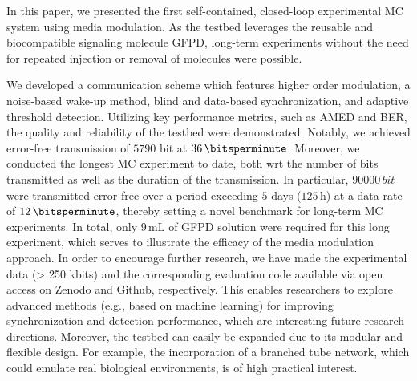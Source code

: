In this paper, we presented the first self-contained, closed-loop experimental \ac{MC} system using media modulation. As the testbed leverages the reusable and biocompatible signaling molecule \ac{GFPD}, long-term experiments without the need for repeated injection or removal of molecules were possible.

We developed a communication scheme which features higher order modulation, a noise-based wake-up method, blind and data-based synchronization, and adaptive threshold detection. Utilizing key performance metrics, such as \ac{AMED} and \ac{BER}, the quality and reliability of the testbed were demonstrated. Notably, we achieved error-free transmission of $\num{5790}$ bit at $36 \, \si{\bitsperminute}$. Moreover, we conducted the longest \ac{MC} experiment to date, both \ac{wrt} the number of bits transmitted as well as the duration of the transmission. In particular, $\num{90000} \, \si{bit}$ were transmitted error-free over a period exceeding $5$ days ($125 \, \si{\hour}$) at a data rate of $12 \, \si{\bitsperminute}$, thereby setting a novel benchmark for long-term MC experiments. In total, only $9 \, \si{\milli \liter}$ of \ac{GFPD} solution were required for this long experiment, which serves to illustrate the efficacy of the media modulation approach.
In order to encourage further research, we have made the experimental data (> 250 kbits) and the corresponding evaluation code available via open access on Zenodo and Github, respectively.
This enables researchers to explore advanced methods (e.g., based on machine learning) for improving synchronization and detection performance, which are interesting future research directions.
Moreover, the testbed can easily be expanded due to its modular and flexible design. For example, the incorporation of a branched tube network, which could emulate real biological environments, is of high practical interest.